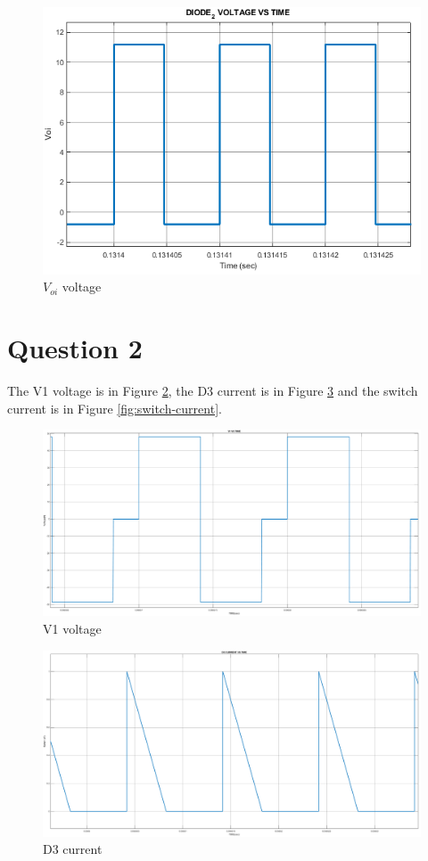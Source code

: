 \documentclass[oneside,12pt]{article}
\begin{document}
\begin{figure}[H]
	\centering
	\includegraphics[scale=0.8]{../q1/Voi}
	\caption{$V_{oi}$ voltage}
	\label{fig:voi}
\end{figure}
\section{Question 2}
The V1 voltage is in Figure \ref{fig:v1}, the D3 current is in Figure \ref{fig:i3d3} and the switch current is in Figure \ref{fig:switch-current}.

\begin{figure}[H]
	\centering
	\includegraphics[scale=0.3]{../q2/v1}
	\caption{V1 voltage}
	\label{fig:v1}
\end{figure}

\begin{figure}[H]
	\centering
	\includegraphics[scale=0.3]{../q2/i3_d3}
	\caption{D3 current}
	\label{fig:i3d3}
\end{figure}
\end{document}
